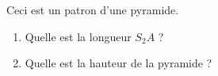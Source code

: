 
\begin{mental}
    Ceci est un patron d'une pyramide.

\begin{center}
   
\end{center}                                                                                                                                                 

\begin{enumerate}
    \item
        Quelle est la longueur \( S_2A\) ?
    \item
        Quelle est la hauteur de la pyramide ?
\end{enumerate}

\end{mental}

